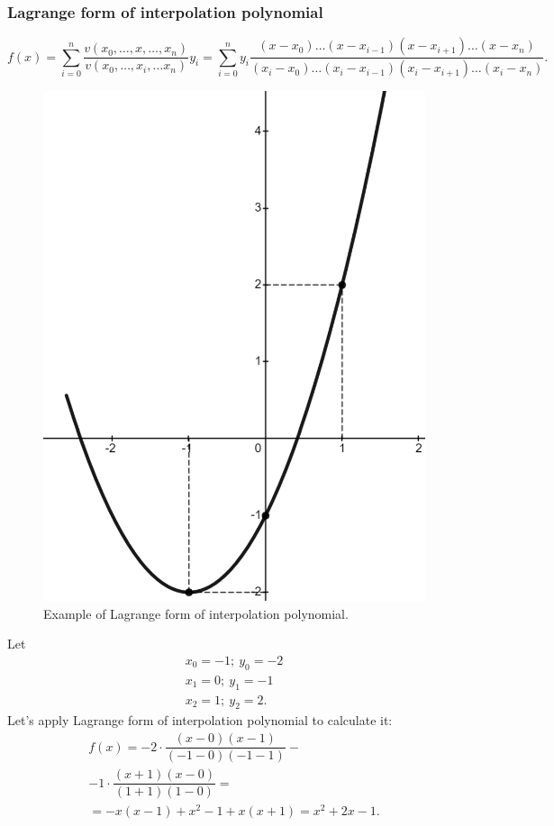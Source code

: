 \subsubsection*{Lagrange form of interpolation polynomial}
\[
    f(x) = \sum\limits_{i=0}^{n} \dfrac{v(x_0, \ldots, x, \ldots, x_n)}{v(x_0, \ldots, x_i, \ldots x_n)} y_i = \sum\limits_{i=0}^{n}y_i \dfrac{(x-x_0)\ldots(x-x_{i-1})(x-x_{i+1})\ldots (x-x_n)}{(x_i - x_0)\ldots (x_i - x_{i-1})(x_i - x_{i+1})\ldots (x_i - x_n)}.  
\]
\begin{figure}
    \includegraphics[height=0.4\columnwidth, width=0.37\columnwidth]{./lectures/images/lecture3_lagrange_example.png}
    \caption*{\small{Example of Lagrange form of interpolation polynomial.}}
\end{figure}
\vspace*{1cm}

\Ex Let 
\[
    \begin{array}{c}
        x_0 = -1; \ y_0 = -2 \\
        x_1 = 0; \ y_1 = -1\\
        x_2 = 1; \ y_2 = 2.
    \end{array} 
\]
Let's apply Lagrange form of interpolation polynomial to calculate it:
\[
    \begin{array}{c}
        f(x) = -2 \cdot \dfrac{(x-0)(x-1)}{(-1 - 0)(-1 -1)} - \\[0.4cm] - 1\cdot \dfrac{(x+1)(x-0)}{(1+1)(1-0)} = \\
         = -x(x-1) + x^2 - 1 + x(x+1) = x^2 + 2x - 1.
    \end{array}  
\]
\vspace*{0.25cm}

